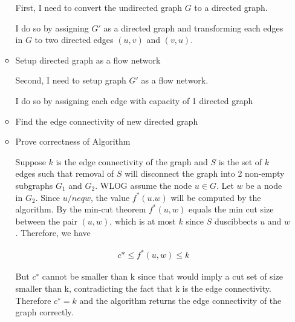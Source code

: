 \documentclass[12pt]{article}
\begin{document}
\begin{enumerate}[1.]
\begin{itemize}
        \begin{mdframed}
        First, I need to convert the undirected graph $G$ to a directed graph.

        \bigskip

        I do so by assigning $G'$ as a directed graph and transforming each edges in $G$
        to two directed edges $(u,v)$ and $(v,u)$.
        \end{mdframed}

        \item Setup directed graph as a flow network

        \begin{mdframed}
        Second, I need to setup graph $G'$ as a flow network.

        \bigskip

        I do so by assigning each edge with capacity of 1 directed graph

        \end{mdframed}

        \item Find the edge connectivity of new directed graph

        \begin{mdframed}

        \end{mdframed}

        \item Prove correctness of Algorithm

        \bigskip

        Suppose $k$ is the edge connectivity of the graph and $S$ is the set of $k$
        edges such that removal of $S$ will disconnect the graph into
        2 non-empty subgraphs $G_1$ and $G_2$. WLOG assume the node $u \in G$.
        Let $w$ be a node in $G_2$. Since $u /neq w$, the value $f^*(u.w)$ will be computed
        by the algorithm. By the min-cut theorem $f^*(u,w)$ equals the min cut size
        between the pair $(u,w)$, which is at most $k$ since $S$ duscibbects $u$ and $w$.
        Therefore, we have

        \begin{align}
            c* \leq f^*(u,w) \leq k
        \end{align}

        But $c^{∗}$ cannot be smaller than k since that would imply a cut set of size smaller than k,
        contradicting the fact that k is the edge connectivity. Therefore $c^{∗} = k$ and the algorithm
        returns the edge connectivity of the graph correctly.


\end{itemize}
\end{enumerate}
\end{document}
